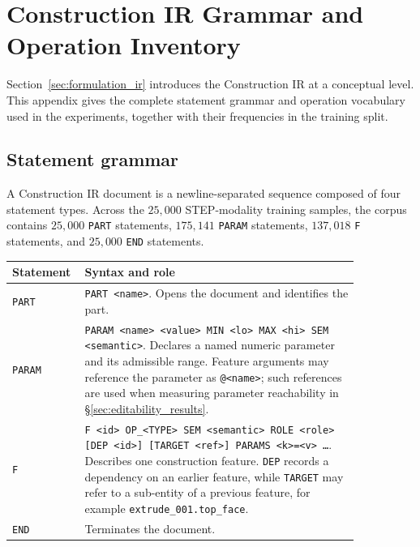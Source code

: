 \documentclass[preprint,12pt]{elsarticle}
\begin{document}
\section{Construction IR Grammar and Operation Inventory}
\label{app:ir_grammar}

Section~\ref{sec:formulation_ir} introduces the Construction IR at a conceptual level.
This appendix gives the complete statement grammar and operation vocabulary used in the
experiments, together with their frequencies in the training split.

\subsection{Statement grammar}
\label{app:ir_statements}

A Construction IR document is a newline-separated sequence composed of four statement
types. Across the $25{,}000$ STEP-modality training samples, the corpus contains
$25{,}000$ \texttt{PART} statements, $175{,}141$ \texttt{PARAM} statements,
$137{,}018$ \texttt{F} statements, and $25{,}000$ \texttt{END} statements.

\begin{center}
  \footnotesize
  \begin{tabular}{
      >{\raggedright\arraybackslash}p{0.11\linewidth}
      >{\raggedright\arraybackslash}p{0.74\linewidth}
    }
    \toprule
    Statement & Syntax and role                                                       \\
    \midrule
    \texttt{PART}
              & \texttt{PART <name>}. Opens the document and identifies the part.     \\

    \texttt{PARAM}
              & \texttt{PARAM <name> <value> MIN <lo> MAX <hi> SEM <semantic>}.
    Declares a named numeric parameter and its admissible range. Feature
    arguments may reference the parameter as \texttt{@<name>}; such
    references are used when measuring parameter reachability in
    \S\ref{sec:editability_results}.                                                  \\

    \texttt{F}
              & \texttt{F <id> OP\_<TYPE> SEM <semantic> ROLE <role> [DEP <id>]
                    [TARGET <ref>] PARAMS <k>=<v> \ldots}. Describes one construction
    feature. \texttt{DEP} records a dependency on an earlier feature,
    while \texttt{TARGET} may refer to a sub-entity of a previous feature,
    for example \texttt{extrude\_001.top\_face}.                                      \\

    \texttt{END}
              & Terminates the document.                                              \\
    \bottomrule
  \end{tabular}
\end{center}
\end{document}
